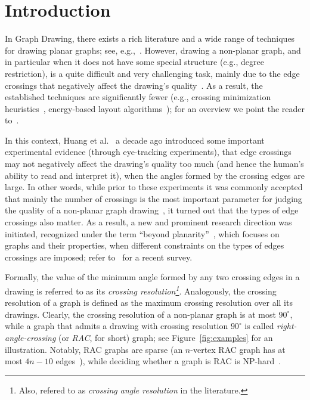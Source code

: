 \documentclass{comjnl}
\begin{document}
\section{Introduction}
\label{sec:introduction}

In Graph Drawing, there exists a rich literature and a wide range of techniques for drawing planar graphs; see, e.g.,~\cite{DBLP:journals/combinatorica/FraysseixPP90,DBLP:conf/gd/GutwengerM98,DBLP:journals/algorithmica/Kant96}. However, drawing a non-planar graph, and in particular when it does not have some special structure (e.g., degree restriction), is a quite difficult and very challenging task, mainly due to the edge crossings that negatively affect the drawing's quality~\cite{DBLP:journals/iwc/Purchase00}. As a result, the established techniques are significantly fewer (e.g., crossing minimization heuristics~\cite{DBLP:journals/algorithmica/EadesW94,DBLP:journals/tsmc/SugiyamaTT81}, energy-based layout algorithms~\cite{DBLP:journals/congnum/Eades84,DBLP:journals/spe/FruchtermanR91}); for an overview we point the reader to~\cite{DBLP:books/ph/BattistaETT99,DBLP:conf/dagstuhl/1999dg,DBLP:reference/crc/2013gd}.

In this context, Huang et al.~\cite{DBLP:conf/apvis/Huang07,DBLP:journals/vlc/HuangEH14} a decade ago introduced some important experimental evidence (through eye-tracking experiments), that edge crossings may not negatively affect the drawing's quality too much (and hence the human's ability to read and interpret it), when the angles formed by the crossing edges are large. In other words, while prior to these experiments it was commonly accepted that mainly the number of crossings is the most important parameter for judging the quality of a non-planar graph drawing~\cite{DBLP:conf/gd/Purchase97,DBLP:journals/iwc/Purchase00}, it turned out that the types of edge crossings also matter. As a result, a new and prominent research direction was initiated, recognized under the term ``beyond planarity''~\cite{Shonan2016,Dagstuhl2016,SoCG2017}, which focuses on graphs and their properties, when different constraints on the types of edges crossings are imposed; refer to~\cite{DBLP:journals/corr/abs-1804-07257} for a recent survey.

Formally, the value of the minimum angle formed by any two crossing edges in a drawing is referred to as its \emph{crossing resolution\footnote{Also, refered to as \emph{crossing angle resolution} in the literature.}}. Analogously, the crossing resolution of a graph is defined as the maximum crossing resolution over all its drawings. Clearly, the crossing resolution of a non-planar graph is at most $90^\circ$, while a graph that admits a drawing with crossing resolution $90^\circ$ is called \emph{right-angle-crossing} (or \emph{RAC}, for short) graph; see Figure~\ref{fig:examples} for an illustration. Notably, RAC graphs are sparse (an $n$-vertex RAC graph has at most $4n-10$ edges~\cite{DBLP:journals/tcs/DidimoEL11}), while deciding whether a graph is RAC is NP-hard~\cite{DBLP:journals/jgaa/ArgyriouBS12}.
\end{document}

